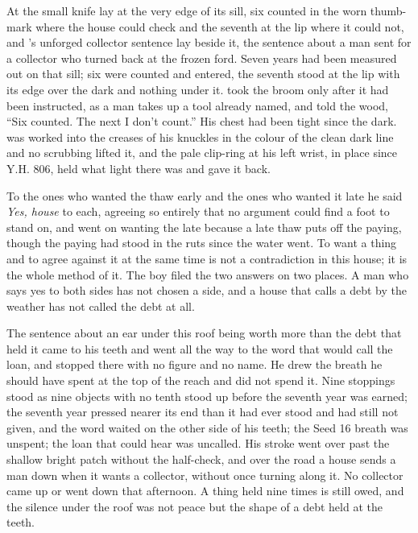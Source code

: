 \scenebreak

At  the small knife lay at the very edge of its sill, six counted in the worn thumb-mark where the house could check and the seventh at the lip where it could not, and 's unforged collector sentence lay beside it, the sentence about a man sent for a collector who turned back at the frozen ford. Seven years had been measured out on that sill; six were counted and entered, the seventh stood at the lip with its edge over the dark and nothing under it.  took the broom only after it had been instructed, as a man takes up a tool already named, and told the wood, “Six counted. The next I don't count.” His chest had been tight since the dark.  was worked into the creases of his knuckles in the colour of the clean dark line and no scrubbing lifted it, and the pale clip-ring at his left wrist, in place since Y.H. 806, held what light there was and gave it back.

To the ones who wanted the thaw early and the ones who wanted it late he said \emph{Yes, house} to each, agreeing so entirely that no argument could find a foot to stand on, and went on wanting the late because a late thaw puts off the paying, though the paying had stood in the ruts since the water went. To want a thing and to agree against it at the same time is not a contradiction in this house; it is the whole method of it. The boy filed the two answers on two places. A man who says yes to both sides has not chosen a side, and a house that calls a debt by the weather has not called the debt at all.

The sentence about an ear under this roof being worth more than the debt that held it came to his teeth and went all the way to the word that would call the loan, and stopped there with no figure and no name. He drew the breath he should have spent at the top of the reach and did not spend it. Nine stoppings stood as nine objects with no tenth stood up before the seventh year was earned; the seventh year pressed nearer its end than it had ever stood and had still not given, and the word waited on the other side of his teeth; the Seed 16 breath was unspent; the loan that could hear was uncalled. His stroke went over  past the shallow bright patch without the half-check, and over the road a house sends a man down when it wants a collector, without once turning along it. No collector came up or went down  that afternoon. A thing held nine times is still owed, and the silence under the roof was not peace but the shape of a debt held at the teeth.

